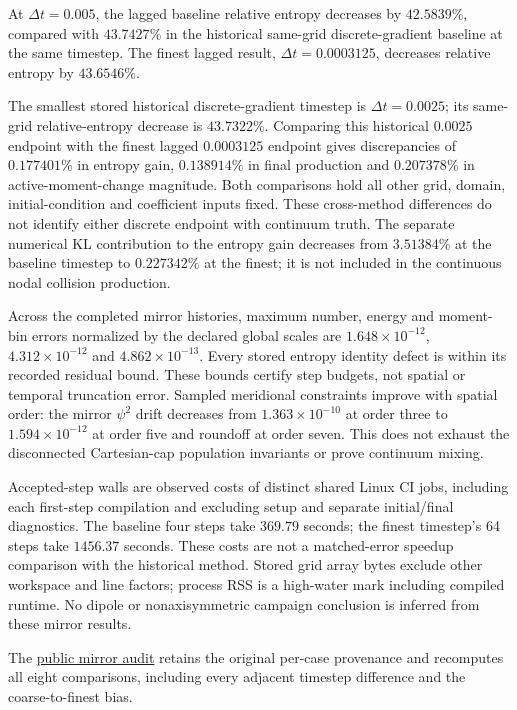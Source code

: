 \documentclass[11pt,letterpaper]{article}
\begin{document}
At $\Delta t=0.005$, the lagged baseline relative entropy decreases by
$42.5839\%$, compared with $43.7427\%$ in the historical same-grid
discrete-gradient baseline at the same timestep. The finest lagged result,
$\Delta t=0.0003125$, decreases relative entropy by $43.6546\%$.

The smallest stored historical discrete-gradient timestep is
$\Delta t=0.0025$; its same-grid relative-entropy decrease
is $43.7322\%$. Comparing this historical $0.0025$ endpoint with the
finest lagged $0.0003125$ endpoint gives discrepancies of $0.177401\%$
in entropy gain, $0.138914\%$ in final production and $0.207378\%$
in active-moment-change magnitude. Both comparisons hold all other grid,
domain, initial-condition and coefficient inputs fixed. These cross-method
differences do not identify either discrete endpoint with continuum truth.
The separate numerical KL contribution to the entropy gain decreases from
$3.51384\%$ at the baseline timestep to $0.227342\%$ at the finest;
it is not included in the continuous nodal collision production.

Across the completed mirror histories, maximum number, energy and
moment-bin errors normalized by the declared global scales are
$1.648\times10^{-12}$, $4.312\times10^{-12}$ and
$4.862\times10^{-13}$. Every stored entropy identity defect is within
its recorded residual bound. These bounds certify step budgets, not
spatial or temporal truncation error. Sampled meridional constraints improve
with spatial order: the mirror $\psi^2$ drift decreases from
$1.363\times10^{-10}$ at order three to $1.594\times10^{-12}$ at order
five and roundoff at order seven. This does not exhaust the disconnected
Cartesian-cap population invariants or prove continuum mixing.

Accepted-step walls are observed costs of distinct shared Linux CI jobs,
including each first-step compilation and excluding setup and separate
initial/final diagnostics. The baseline four steps take $369.79$ seconds;
the finest timestep's 64 steps take $1456.37$ seconds. These costs are not
a matched-error speedup comparison with the historical method. Stored grid
array bytes exclude other workspace and line factors; process RSS is a
high-water mark including compiled runtime. No dipole or nonaxisymmetric
campaign conclusion is inferred from these mirror results.

The \href{https://github.com/rogeriojorge/sato-morrison/blob/main/results/nonuniform_entropy/mirror_audit.json}{public mirror audit}
retains the original per-case provenance and recomputes all eight comparisons,
including every adjacent timestep difference and the coarse-to-finest bias.
\end{document}
